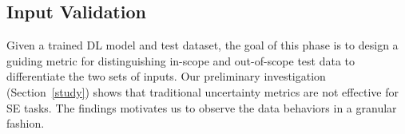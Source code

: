 

\subsection{Input Validation}
\label{validation}
Given a trained DL model and test dataset, the goal of this phase is to design a guiding metric for distinguishing in-scope and out-of-scope test data to differentiate the two sets of inputs. 
Our preliminary investigation (Section~\ref{study}) shows that traditional uncertainty metrics are not effective for SE tasks. The findings motivates us to observe the data behaviors in a granular fashion. 






